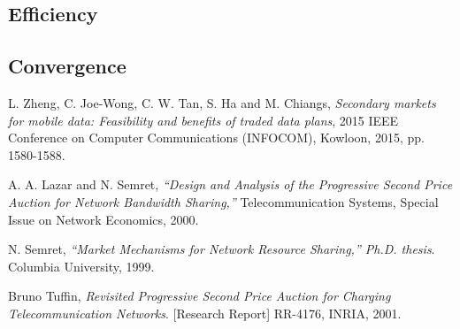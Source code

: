 \documentclass[12pt]{article}
\theoremstyle{definition}
\begin{document}
\begin{multicols}{2}
\subsection{Efficiency}

\subsection{Convergence}

\end{multicols}

\begin{thebibliography}{9}

L. Zheng, C. Joe-Wong, C. W. Tan, S. Ha and M. Chiangs, 
\textit{Secondary markets for mobile data: Feasibility and benefits of traded
data plans}, 2015 IEEE
Conference on Computer Communications (INFOCOM), Kowloon, 2015, pp. 1580-1588.

A. A. Lazar and N. Semret, 
\textit{“Design and Analysis of the Progressive Second Price Auction for Network
Bandwidth Sharing,”} Telecommunication Systems, Special Issue on Network Economics, 2000.

N. Semret, 
\textit{“Market Mechanisms for Network Resource Sharing,”
Ph.D. thesis}. 
Columbia University, 1999.

Bruno Tuffin,
\textit{Revisited Progressive Second Price Auction for Charging
Telecommunication Networks}.
[Research Report] RR-4176, INRIA, 2001.
 
\end{thebibliography}
\end{document}
